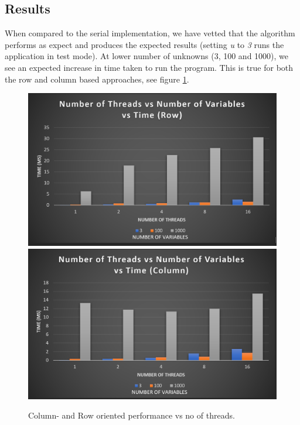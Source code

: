   \subsection{Results}
    When compared to the serial implementation, we have vetted that the algorithm performs as expect and produces the expected results 
    (setting \textit{u} to \textit{3} runs the application in test mode). At lower number of unknowns (3, 100 and 1000), we see an expected increase in time taken to run the program. 
    This is true for both the row and column based approaches, see figure \ref{fig:colrowlow}. 
    \begin{figure}
      \centering
      \includegraphics[width=0.49\linewidth]{Figures/rowLow.png}
      \includegraphics[width=0.49\linewidth]{Figures/colLow.png}
      \caption{Column- and Row oriented performance vs no of threads.}
      \label{fig:colrowlow}
    \end{figure}

